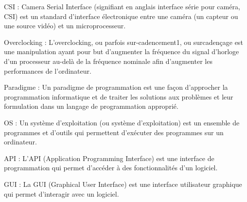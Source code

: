 \begin{definition}

    CSI : Camera Serial Interface (signifiant en anglais interface série pour caméra, CSI) est un standard d'interface électronique entre une caméra (un capteur ou une source vidéo) et un microprocesseur.
    
\end{definition}

\begin{definition}
    Overclocking : L'overclocking, ou parfois sur-cadencement1, ou surcadençage est une manipulation ayant pour but d'augmenter la fréquence du signal d'horloge d'un processeur au-delà de la fréquence nominale afin d'augmenter les performances de l'ordinateur.
\end{definition}

\begin{definition}
    Paradigme : Un paradigme de programmation est une façon d'approcher la programmation informatique et de traiter les solutions aux problèmes et leur formulation dans un langage de programmation approprié.
\end{definition}

\begin{definition}
    OS : Un système d'exploitation (ou système d'exploitation) est un ensemble de programmes et d'outils qui permettent d'exécuter des programmes sur un ordinateur.
\end{definition}

\begin{definition}
    API : L'API (Application Programming Interface) est une interface de programmation qui permet d'accéder à des fonctionnalités d'un logiciel.
\end{definition}

\begin{definition}
    GUI : La GUI (Graphical User Interface) est une interface utilisateur graphique qui permet d'interagir avec un logiciel.
\end{definition}